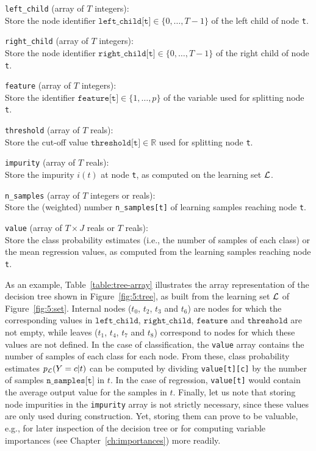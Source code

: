 \begin{description}

\item \texttt{left\_child} (array of $T$ integers):\hfill\\
    Store the node identifier $\texttt{left\_child[t]} \in \{0,\dots,T-1\}$ of the left child of node \texttt{t}.
\item \texttt{right\_child} (array of $T$ integers):\hfill\\
    Store the node identifier $\texttt{right\_child[t]} \in \{0,\dots,T-1\}$ of the right child of node \texttt{t}.
\item \texttt{feature} (array of $T$ integers):\hfill\\
    Store the identifier $\texttt{feature[t]} \in \{1, \dots, p\}$ of the variable used for splitting  node \texttt{t}.
\item \texttt{threshold} (array of $T$ reals):\hfill\\
    Store the cut-off value $\texttt{threshold[t]} \in \mathbb{R}$ used for splitting  node \texttt{t}.
\item \texttt{impurity} (array of $T$ reals):\hfill\\
    Store the impurity $i(t)$ at node \texttt{t}, as computed on the learning set ${\cal L}$.
\item \texttt{n\_samples} (array of $T$ integers or reals):\hfill\\
    Store the (weighted) number \texttt{n\_samples[t]} of learning samples reaching node \texttt{t}.
\item \texttt{value} (array of $T\times J$ reals or $T$ reals):\hfill\\
    Store the class probability estimates (i.e., the number of samples of each class) or the mean regression values,
    as computed from the learning samples reaching node \texttt{t}.

\end{description}

As an example, Table~\ref{table:tree-array} illustrates the array
representation of the decision tree shown in Figure~\ref{fig:5:tree}, as built
from the learning set ${\cal L}$ of Figure~\ref{fig:5:set}. Internal nodes
($t_0$, $t_2$, $t_3$ and $t_6$) are nodes for which the corresponding values in
$\texttt{left\_child}$, $\texttt{right\_child}$, $\texttt{feature}$ and
$\texttt{threshold}$ are not empty, while leaves ($t_1$, $t_4$, $t_7$ and
$t_8$) correspond to nodes for which these values are not defined. In the case
of classification, the \texttt{value} array contains the number of samples of
each class for each node. From these, class probability estimates $p_{\cal
L}(Y=c|t)$ can be computed by dividing \texttt{value[t][c]} by the number of
samples $\texttt{n\_samples[t]}$ in $t$. In the case of regression,
\texttt{value[t]} would  contain the average output value for the samples in
$t$. Finally, let us note that storing node impurities in the \texttt{impurity}
array is not strictly necessary, since these values are only used during
construction. Yet, storing them can prove to be valuable, e.g., for
later inspection of the decision tree or for computing variable importances (see
Chapter~\ref{ch:importances}) more readily.


